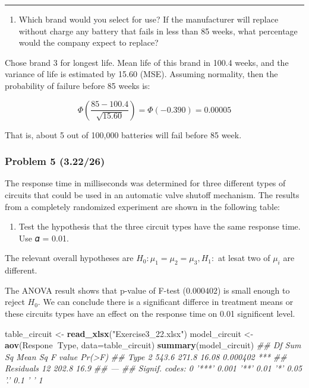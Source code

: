 \documentclass[]{article}
\newenvironment{Shaded}{\begin{snugshade}}{\end{snugshade}}
\newcommand{\CommentTok}[1]{\textcolor[rgb]{0.56,0.35,0.01}{\textit{#1}}}
\newcommand{\DataTypeTok}[1]{\textcolor[rgb]{0.13,0.29,0.53}{#1}}
\newcommand{\KeywordTok}[1]{\textcolor[rgb]{0.13,0.29,0.53}{\textbf{#1}}}
\newcommand{\NormalTok}[1]{#1}
\newcommand{\OperatorTok}[1]{\textcolor[rgb]{0.81,0.36,0.00}{\textbf{#1}}}
\newcommand{\StringTok}[1]{\textcolor[rgb]{0.31,0.60,0.02}{#1}}
\providecommand{\tightlist}{%
  \setlength{\itemsep}{0pt}\setlength{\parskip}{0pt}}
\begin{document}
\begin{center}\rule{0.5\linewidth}{\linethickness}\end{center}

\begin{enumerate}
\def\labelenumi{(\alph{enumi})}
\setcounter{enumi}{3}
\tightlist
\item
  Which brand would you select for use? If the manufacturer will replace
  without charge any battery that fails in less than 85 weeks, what
  percentage would the company expect to replace?
\end{enumerate}

Chose brand 3 for longest life. Mean life of this brand in 100.4 weeks,
and the variance of life is estimated by 15.60 (MSE). Assuming
normality, then the probability of failure before 85 weeks is:

\[Φ\left(\frac{85-100.4}{\sqrt{15.60}}\right)=Φ(-0.390)=0.00005\]

That is, about 5 out of 100,000 batteries will fail before 85 week.

\hypertarget{problem-5-3.2226}{%
\subsubsection{Problem 5 (3.22/26)}\label{problem-5-3.2226}}

The response time in milliseconds was determined for three different
types of circuits that could be used in an automatic valve shutoff
mechanism. The results from a completely randomized experiment are shown
in the following table:

\begin{enumerate}
\def\labelenumi{(\alph{enumi})}
\tightlist
\item
  Test the hypothesis that the three circuit types have the same
  response time. Use 𝛼 = 0.01.
\end{enumerate}

The relevant overall hypotheses are \(H_0: \mu_1=\mu_2=\mu_3, H_1:\) at
lesat two of \(\mu_i\) are different.

The ANOVA result shows that p-value of F-test (\(0.000402\)) is small
enough to reject \(H_0\). We can conclude there is a significant
differce in treatment means or these circuits types have an effect on
the response time on 0.01 significent level.

\begin{Shaded}
\begin{Highlighting}[]
\NormalTok{table_circuit <-}\StringTok{ }\KeywordTok{read_xlsx}\NormalTok{(}\StringTok{"Exercise3_22.xlsx"}\NormalTok{)}
\NormalTok{model_circuit <-}\StringTok{ }\KeywordTok{aov}\NormalTok{(Respone}\OperatorTok{~}\NormalTok{Type, }\DataTypeTok{data=}\NormalTok{table_circuit)}
\KeywordTok{summary}\NormalTok{(model_circuit)}
\CommentTok{##             Df Sum Sq Mean Sq F value   Pr(>F)    }
\CommentTok{## Type         2  543.6   271.8   16.08 0.000402 ***}
\CommentTok{## Residuals   12  202.8    16.9                     }
\CommentTok{## ---}
\CommentTok{## Signif. codes:  0 '***' 0.001 '**' 0.01 '*' 0.05 '.' 0.1 ' ' 1}
\end{Highlighting}
\end{Shaded}
\end{document}
